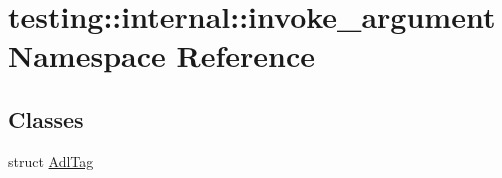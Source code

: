\hypertarget{namespacetesting_1_1internal_1_1invoke__argument}{}\section{testing\+:\+:internal\+:\+:invoke\+\_\+argument Namespace Reference}
\label{namespacetesting_1_1internal_1_1invoke__argument}
\subsection*{Classes}
\begin{DoxyCompactItemize}
\item 
struct \hyperlink{structtesting_1_1internal_1_1invoke__argument_1_1AdlTag}{Adl\+Tag}
\end{DoxyCompactItemize}
